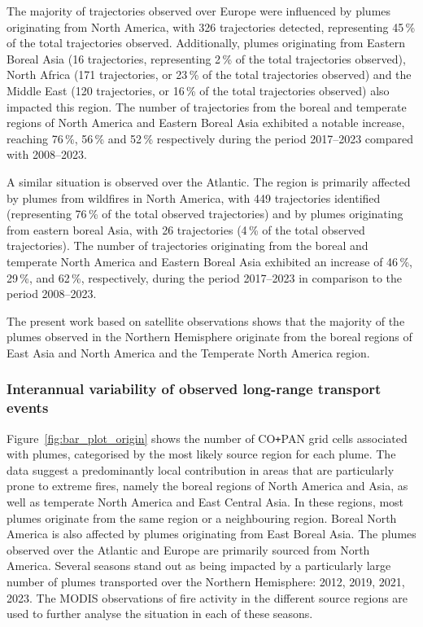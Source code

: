 \documentclass[acp, manuscript]{copernicus}
\begin{document}
The majority of trajectories observed over Europe were influenced by plumes originating from North America, with 326 trajectories detected, representing 45\,\% of the total trajectories observed. Additionally, plumes originating from Eastern Boreal Asia (16 trajectories, representing 2\,\% of the total trajectories observed), North Africa (171 trajectories, or 23\,\% of the total trajectories observed) and the Middle East (120 trajectories, or 16\,\% of the total trajectories observed) also impacted this region. 
The number of trajectories from the boreal and temperate regions of North America and Eastern Boreal Asia exhibited a notable increase, reaching 76\,\%, 56\,\% and 52\,\% respectively during the period 2017--2023 compared with 2008--2023.

A similar situation is observed over the Atlantic. The region is primarily affected by plumes from wildfires in North America, with 449 trajectories identified (representing 76\,\% of the total observed trajectories) and by plumes originating from eastern boreal Asia, with 26 trajectories (4\,\% of the total observed trajectories). The number of trajectories originating from the boreal and temperate North America and Eastern Boreal Asia exhibited an increase of 46\,\%, 29\,\%, and 62\,\%, respectively, during the period 2017--2023 in comparison to the period 2008--2023.

The present work based on satellite observations shows that the majority of the plumes observed in the Northern Hemisphere originate from the boreal regions of East Asia and North America and the Temperate North America region. 


\subsubsection{Interannual variability of observed long-range transport events}

Figure~\ref{fig:bar_plot_origin} shows the number of CO\texttt{+}PAN grid cells associated with plumes, categorised by the most likely source region for each plume.
The data suggest a predominantly local contribution in areas that are particularly prone to extreme fires, namely the boreal regions of North America and Asia, as well as temperate North America and East Central Asia. In these regions, most plumes originate from the same region or a neighbouring region. Boreal North America is also affected by plumes originating from East Boreal Asia. The plumes observed over the Atlantic and Europe are primarily sourced from North America.
Several seasons stand out as being impacted by a particularly large number of plumes transported over the Northern Hemisphere: 2012, 2019, 2021, 2023. The MODIS observations of fire activity in the different source regions are used to further analyse the situation in each of these seasons.
\end{document}
